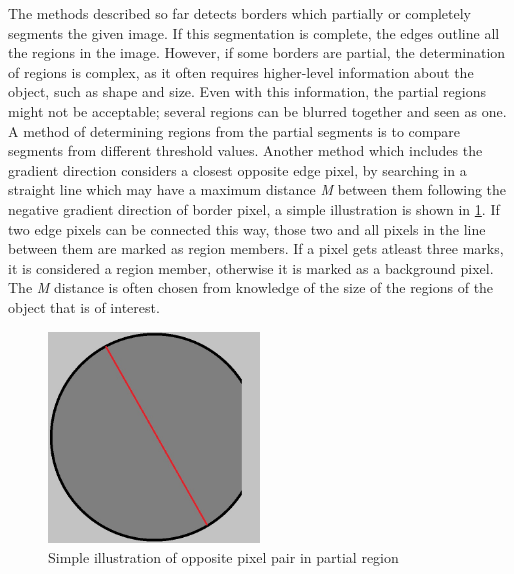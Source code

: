 The methods described so far detects borders which partially or completely segments the given image. If this segmentation is complete, the edges outline all the regions in the image. However, if some borders are partial, the determination of regions is  complex, as it often requires higher-level information about the object, such as shape and size. Even with this information, the partial regions might not be acceptable; several regions can be blurred together and seen as one. A method of determining regions from the partial segments is to compare segments from different threshold values. Another method which includes the gradient direction considers a closest opposite edge pixel, by searching in a straight line which may have a maximum distance \textit{M} between them following the negative gradient direction of border pixel, a simple illustration is shown in \cref{fig:partial_region}. If two edge pixels can be connected this way, those two and all pixels in the line between them are marked as region members. If a pixel gets atleast three marks, it is considered a region member, otherwise it is marked as a background pixel. The \textit{M} distance is often chosen from knowledge of the size of the regions of the object that is of interest.

\begin{figure}[H]
	\centering
	\includegraphics[width=0.5\textwidth]{graphics/partial_region.jpg}
	\caption{Simple illustration of opposite pixel pair in partial region}
	\label{fig:partial_region}
\end{figure}